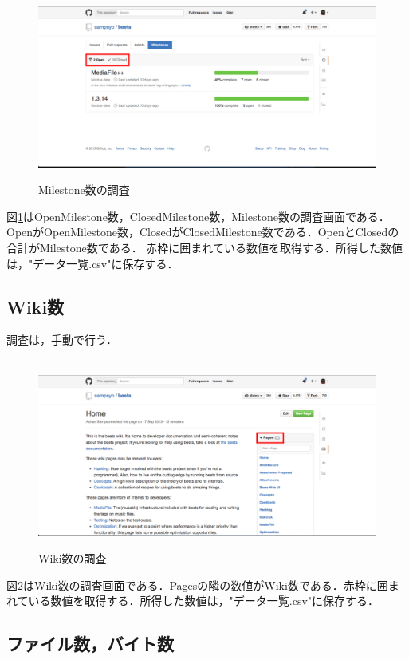 \begin{figure}[H]
\centering　
\includegraphics[width=13cm]{Milestone.png}
\caption{Milestone数の調査}\label{tab:Milestone}
\end{figure}

図\ref{tab:Milestone}はOpenMilestone数，ClosedMilestone数，Milestone数の調査画面である．OpenがOpenMilestone数，ClosedがClosedMilestone数である．OpenとClosedの合計がMilestone数である．
赤枠に囲まれている数値を取得する．所得した数値は，"データ一覧.csv"に保存する．

\subsection{Wiki数}
調査は，手動で行う．

\begin{figure}[H]
\centering　
\includegraphics[width=13cm]{Wiki.png}
\caption{Wiki数の調査}\label{tab:Wiki}
\end{figure}

図\ref{tab:Wiki}はWiki数の調査画面である．Pagesの隣の数値がWiki数である．赤枠に囲まれている数値を取得する．所得した数値は，"データ一覧.csv"に保存する．


\subsection{ファイル数，バイト数}

